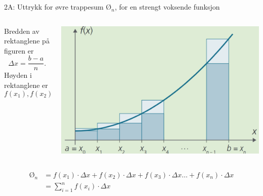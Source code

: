 \greenheader
\begin{frame}{2A: Uttrykk for øvre trappesum $\text{Ø}_n$,  for en strengt voksende funksjon}
    \begin{columns} 
        \begin{column}{0.42\textwidth}
            Bredden av rektanglene på figuren er 
            \[
                \Delta x = \frac{b-a}{n}.
            \]
            Høyden i rektanglene er 
            \[
                f(x_1), f(x_2), f(x_3), \dots, f(x_{n}).
            \]
           
            
        \end{column}
        \begin{column}{0.58\textwidth}
            \centering
            \includegraphics[width=1\linewidth]{R2-K2A-15.png}
        \end{column}
    \end{columns}
    \begin{align*}
                 \text{Ø}_n &=  
                 f(x_1)\cdot \Delta x + f(x_2)\cdot \Delta x + f(x_3)\cdot \Delta x \dots + f(x_{n})\cdot \Delta x\\
                &=  \sum_{i=1}^{n} f(x_{i})\cdot \Delta x
            \end{align*}
\end{frame}

